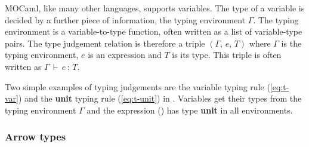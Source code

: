 \documentclass[12pt,twoside,notitlepage]{report}
\theoremstyle{plain}%
\theoremstyle{definition}
\theoremstyle{remark}
\begin{document}
MOCaml, like many other languages, supports variables. The type of a variable is decided by a further piece of information, the typing environment $ \Gamma $. The typing environment is a variable-to-type function, often written as a list of variable-type pairs. The type judgement relation is therefore a triple $ (\Gamma,\,e,\,T) $ where $ \Gamma $ is the typing environment, $ e $ is an expression and $ T $ is its type. This triple is often written as $ \Gamma\,\vdash\,e\,:\,T $. 

Two simple examples of typing judgements are the variable typing rule (\ref{eq:t-var}) and the \textbf{unit} typing rule (\ref{eq:t-unit}) in . Variables get their types from the typing environment $ \Gamma $ and the expression () has type \textbf{unit} in all environments.
\subsubsection{Arrow types}
\end{document}
